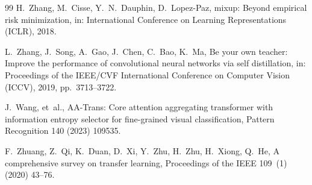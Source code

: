 \documentclass[review,12pt,authoryear]{elsarticle}
\begin{document}
\begin{thebibliography}{99}
H.~Zhang, M.~Cisse, Y.~N.~Dauphin, D.~Lopez-Paz,
mixup: Beyond empirical risk minimization,
in: International Conference on Learning Representations (ICLR), 2018.

L.~Zhang, J.~Song, A.~Gao, J.~Chen, C.~Bao, K.~Ma,
Be your own teacher: Improve the performance of convolutional neural networks via self distillation,
in: Proceedings of the IEEE/CVF International Conference on Computer Vision (ICCV), 2019, pp.~3713--3722.

J.~Wang, et~al.,
AA-Trans: Core attention aggregating transformer with information entropy selector for fine-grained visual classification,
Pattern Recognition 140 (2023) 109535.

F.~Zhuang, Z.~Qi, K.~Duan, D.~Xi, Y.~Zhu, H.~Zhu, H.~Xiong, Q.~He,
A comprehensive survey on transfer learning,
Proceedings of the IEEE 109~(1) (2020) 43--76.

\end{thebibliography}
\end{document}
